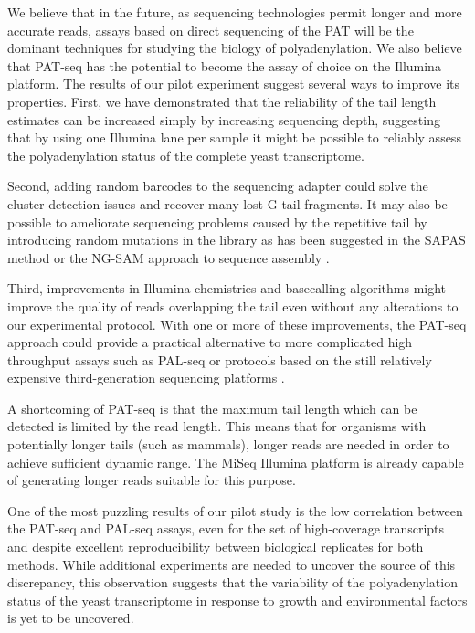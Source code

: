 \documentclass[10pt]{article}
\begin{document}
We believe that in the future, as sequencing technologies permit longer and more accurate reads, assays based on direct sequencing of the PAT will be the dominant techniques for studying the biology of polyadenylation. We also believe that PAT-seq has the potential to become the assay of choice on the Illumina platform.  The results of our pilot experiment suggest several ways to improve its properties. First, we have demonstrated that the reliability of the tail length estimates can be increased simply by increasing sequencing depth, suggesting that by using one Illumina lane per sample it might be possible to reliably assess the polyadenylation status of the complete yeast transcriptome. 

Second, adding random barcodes to the sequencing adapter could solve the cluster detection issues and recover many lost G-tail fragments.  It may also be possible to ameliorate sequencing problems caused by the repetitive tail by introducing random mutations in the library as has been suggested in the SAPAS method \cite{fu11} or the NG-SAM approach to sequence assembly \cite{sipos12}.

Third, improvements in Illumina chemistries and basecalling algorithms might improve the quality of reads overlapping the tail even without any alterations to our experimental protocol. With one or more of these improvements, the PAT-seq approach could provide a practical alternative to more complicated high throughput assays such as PAL-seq or protocols based on the still relatively expensive third-generation sequencing platforms \cite{sharon13}.

A shortcoming of PAT-seq is that the maximum tail length which can be detected is limited by the read length. This means that for organisms with potentially longer tails (such as mammals), longer reads are needed in order to achieve sufficient dynamic range. The MiSeq Illumina platform is already capable of generating longer reads suitable for this purpose.

One of the most puzzling results of our pilot study is the low correlation between the PAT-seq and PAL-seq assays, even for the set of high-coverage transcripts and despite excellent reproducibility between biological replicates for both methods. While additional experiments are needed to uncover the source of this discrepancy, this observation suggests that the variability of the polyadenylation status of the yeast transcriptome in response to growth and environmental factors is yet to be uncovered.
\end{document}
